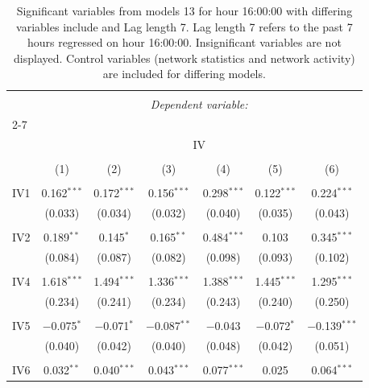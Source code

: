 
\begin{table}[!htbp] \centering 
  \caption{Significant variables from models 13 for hour 16:00:00 with differing variables include 
                               and Lag length 7. Lag length 7 refers to the past 7 hours regressed on hour 16:00:00. 
                               Insignificant variables are not displayed. 
                               Control variables (network statistics and network activity) are 
                               included for differing models.} 
  \label{IVmodels1_t_hourlagged3} 
\scriptsize 
\begin{tabular}{@{\extracolsep{5pt}}lcccccc} 
\\[-1.8ex]\hline 
\hline \\[-1.8ex] 
 & \multicolumn{6}{c}{\textit{Dependent variable:}} \\ 
\cline{2-7} 
\\[-1.8ex] & \multicolumn{6}{c}{IV} \\ 
\\[-1.8ex] & (1) & (2) & (3) & (4) & (5) & (6)\\ 
\hline \\[-1.8ex] 
 IV1 & 0.162$^{***}$ & 0.172$^{***}$ & 0.156$^{***}$ & 0.298$^{***}$ & 0.122$^{***}$ & 0.224$^{***}$ \\ 
  & (0.033) & (0.034) & (0.032) & (0.040) & (0.035) & (0.043) \\ 
  & & & & & & \\ 
 IV2 & 0.189$^{**}$ & 0.145$^{*}$ & 0.165$^{**}$ & 0.484$^{***}$ & 0.103 & 0.345$^{***}$ \\ 
  & (0.084) & (0.087) & (0.082) & (0.098) & (0.093) & (0.102) \\ 
  & & & & & & \\ 
 IV4 & 1.618$^{***}$ & 1.494$^{***}$ & 1.336$^{***}$ & 1.388$^{***}$ & 1.445$^{***}$ & 1.295$^{***}$ \\ 
  & (0.234) & (0.241) & (0.234) & (0.243) & (0.240) & (0.250) \\ 
  & & & & & & \\ 
 IV5 & $-$0.075$^{*}$ & $-$0.071$^{*}$ & $-$0.087$^{**}$ & $-$0.043 & $-$0.072$^{*}$ & $-$0.139$^{***}$ \\ 
  & (0.040) & (0.042) & (0.040) & (0.048) & (0.042) & (0.051) \\ 
  & & & & & & \\ 
 IV6 & 0.032$^{**}$ & 0.040$^{***}$ & 0.043$^{***}$ & 0.077$^{***}$ & 0.025 & 0.064$^{***}$ \\ 

\end{tabular}
\end{table}
